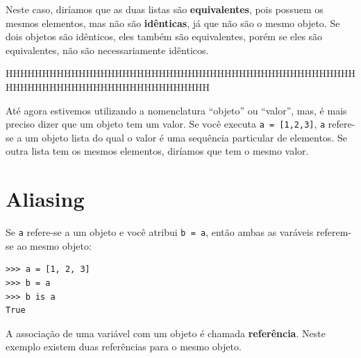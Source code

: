 Neste caso, diríamos que as duas listas são {\bf equivalentes},
pois possuem os mesmos elementos, mas não são {\bf idênticas}, já
que não são o mesmo objeto. Se dois objetos são idênticos, eles também
são equivalentes, porém se eles são equivalentes, não são necessariamente
idênticos.


HHHHHHHHHHHHHHHHHHHHHHHHHHHHHHHHHHHHHHHHHHHHHHHHHHHHHHHHHHHHHHHHHHHHHHHHHHHH

Até agora estivemos utilizando a nomenclatura ``objeto'' ou ``valor'', mas, é
mais preciso dizer que um objeto tem um valor. Se você executa 
{\tt a = [1,2,3]}, {\tt a} refere-se a um objeto lista do qual o
valor é uma sequência particular de elementos. Se outra lista tem os mesmos
elementos, diríamos que tem o mesmo valor.



\section{Aliasing}


Se {\tt a} refere-se a um objeto e você atribui {\tt b = a},
então ambas as varáveis referem-se ao mesmo objeto:


\beforeverb
\begin{verbatim}
>>> a = [1, 2, 3]
>>> b = a
>>> b is a
True
\end{verbatim}
\afterverb
%

A associação de uma variável com um objeto é chamada
{\bf referência}. Neste exemplo existem duas referências para o
mesmo objeto.

